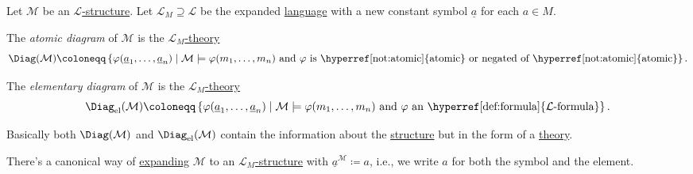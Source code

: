 \begin{definition*}
	Let \(\mathcal{M} \) be an \hyperref[def:structure]{\(\mathcal{L}\)-structure}. Let \(\mathcal{L} _M \supseteq \mathcal{L} \)  be the expanded \hyperref[def:language]{language} with a new constant symbol \(\underline{a}\) for each \(a\in M\).

	\begin{definition}\label{def:atomic-diagram}
		The \emph{atomic diagram} of \(\mathcal{M} \) is the \hyperref[def:theory]{\(\mathcal{L} _{M}\)-theory}
		\[
			\Diag(\mathcal{M} ) \coloneqq \left\{ \varphi (\underline{a}_1, \dots , \underline{a}_n) \mid \mathcal{M} \models \varphi (m_1, \dots , m_n) \text{ and \(\varphi \) is \hyperref[not:atomic]{atomic} or negated of \hyperref[not:atomic]{atomic}} \right\}.
		\]
	\end{definition}

	\begin{definition}\label{def:elementary-diagram}
		The \emph{elementary diagram} of \(\mathcal{M} \) is the \hyperref[def:theory]{\(\mathcal{L} _{M}\)-theory}
		\[
			\Diag_{\mathrm{el}}(\mathcal{M} ) \coloneqq \left\{ \varphi (\underline{a}_1, \dots , \underline{a}_n) \mid \mathcal{M} \models \varphi (m_1, \dots , m_n) \text{ and \(\varphi \) an \hyperref[def:formula]{\(\mathcal{L}\)-formula}} \right\}.
		\]
	\end{definition}
\end{definition*}

\begin{intuition}
	Basically both \(\Diag(\mathcal{M} )\) and \(\Diag_{\mathrm{el} }(\mathcal{M} )\) contain the information about the \hyperref[def:structure]{structure} but in the form of a \hyperref[def:theory]{theory}.
\end{intuition}

\begin{notation}
	There's a canonical way of \hyperref[not:expansion]{expanding} \(\mathcal{M} \) to an \hyperref[def:structure]{\(\mathcal{L} _M\)-structure} with \(\underline{a}^{\mathcal{M}} \coloneqq a\), i.e., we write \(a\) for both the symbol and the element.
\end{notation}

